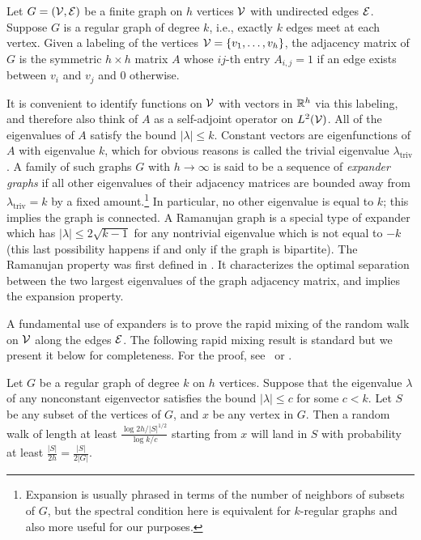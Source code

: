 Let $G = (\mathcal{V},{\mathcal{E}})$ be a finite graph on $h$ vertices ${\mathcal{V}}$
with undirected edges ${\mathcal{E}}$.  Suppose $G$ is a regular graph of degree
$k$, i.e., exactly $k$ edges meet at each vertex. Given a
labeling of the vertices ${\mathcal{V}} = \{v_1,\ldots , v_h\}$, the adjacency
matrix of $G$ is the symmetric $h\times h$ matrix $A$ whose $ij$-th
entry $A_{i,j} = 1$ if an edge exists between $v_i$ and $v_j$ and 0
otherwise.

It is convenient to identify functions on ${\mathcal{V}}$ with vectors in
${\mathbb{R}}^h$ via this labeling, and therefore also think of $A$ as a
self-adjoint operator on $L^2({\mathcal{V}})$.  All of the eigenvalues of $A$
satisfy the bound $|\lambda| \leq k$. Constant vectors are
eigenfunctions of $A$ with eigenvalue $k$, which for obvious reasons
is called the trivial eigenvalue $\lambda_{\operatorname{triv}}$. A
family of such graphs $G$ with $h \rightarrow \infty$ is said to be a
sequence of \emph{expander graphs} if all other eigenvalues of their
adjacency matrices are bounded away from
$\lambda_{\operatorname{triv}}= k$ by a fixed
amount.\footnote{Expansion is usually phrased in terms of the number
  of neighbors of subsets of $G$, but the spectral condition here is
  equivalent for $k$-regular graphs and also more useful for our
  purposes.}  In particular, no other eigenvalue is equal to $k$; this
implies the graph is connected.  A Ramanujan graph is a special type
of expander which has $|\lambda| \leq 2\sqrt{k-1}$ for any nontrivial
eigenvalue which is not equal to $-k$ (this last possibility happens
if and only if the graph is bipartite). The Ramanujan property was
first defined in \cite{LubPS}. It characterizes the optimal separation
between the two largest eigenvalues of the graph adjacency matrix, and
implies the expansion property.

A fundamental use of expanders is to prove the rapid mixing of the
random walk on ${\mathcal{V}}$ along the edges ${\mathcal{E}}$. The following rapid mixing
result is standard but we present it below for completeness. For the
proof, see~\cite{jao+miller+venkatesan09} or \cite{DSV,Lub,Sarnak}.

\begin{prop}\label{prop:mixing} Let $G$ be a regular graph of degree
  $k$ on $h$ vertices. Suppose that the eigenvalue $\lambda$ of any
  nonconstant eigenvector satisfies the bound $|\lambda| \leq c$ for
  some $c < k$. Let $S$ be any subset of the vertices of $G$, and $x$
  be any vertex in $G$. Then a random walk of length at least
  $\frac{\log 2h/|S|^{1/2}}{\log k/c}$ starting from $x$ will land in
  $S$ with probability at least $\frac{|S|}{2h} = \frac{|S|}{2|G|}$.
\end{prop}


